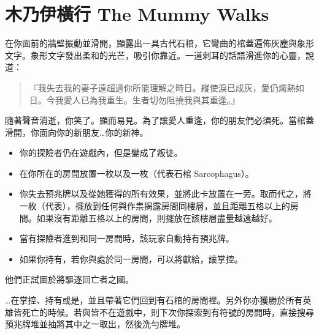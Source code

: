 
\chapter{木乃伊橫行 The Mummy Walks}

\begin{HauntStory}
	在你面前的牆壁振動並滑開，顯露出一具古代石棺，它彎曲的棺蓋遍佈灰塵與象形文字。象形文字發出柔和的光芒，吸引你靠近。一道刺耳的話語滑進你的心靈，說道：
	\begin{quote}
		『我失去我的妻子遠超過你所能理解之時日。縱使淚已成灰，愛仍熾熱如日。今我愛人已為我重生。生者切勿阻撓我與其重逢。』
	\end{quote}
	隨著聲音消逝，你笑了。顯而易見。為了讓愛人重逢，你的朋友們必須死。當棺蓋滑開，你面向你的新朋友…你的新神。
\end{HauntStory}

\vspace*{-1em}
\begin{itemize}
	\item 你的探險者仍在遊戲內，但是變成了叛徒。
	\item 在你所在的房間放置一枚以及一枚（代表石棺 Sarcophagus）。
	\item 你失去預兆牌以及從她獲得的所有效果，並將此卡放置在一旁。取而代之，將一枚（代表），擺放到任何與作祟揭露房間同樓層，並且距離五格以上的房間。如果沒有距離五格以上的房間，則擺放在該樓層盡量越遠越好。
	\item 當有探險者進到和同一房間時，該玩家自動持有預兆牌。
	\item 如果你持有，若你與處於同一房間，可以將獻給，讓掌控。
\end{itemize}

他們正試圖於將驅逐回亡者之國。

…在掌控、持有或是，並且帶著它們回到有石棺的房間裡。另外你亦獲勝於所有英雄皆死亡的時候。若與皆不在遊戲中，則下次你探索到有\OmenSymbol{}符號的房間時，直接搜尋預兆牌堆並抽將其中之一取出，然後洗勻牌堆。

\vfill\null\pagebreak


